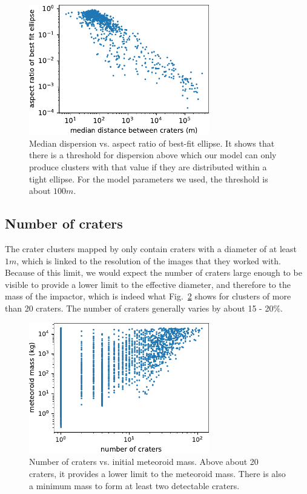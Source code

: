 \begin{figure}
    \centering
    \includegraphics[width=0.7\textwidth]{figures/disp_vs_aspect}
    \caption{Median dispersion vs. aspect ratio of best-fit ellipse. It shows that there is a threshold for dispersion above which our model can only produce clusters with that value if they are distributed within a tight ellipse. For the model parameters we used, the threshold is about $100\unit{m}$.}
    \label{fig:disp_vs_aspect}
\end{figure}

\subsection{Number of craters}
The crater clusters mapped by \cite{daubar2019recently} only contain craters with a diameter of at least $1\unit{m}$, which is linked to the resolution of the images that they worked with.
Because of this limit, we would expect the number of craters large enough to be visible to provide a lower limit to the effective diameter, and therefore to the mass of the impactor, which is indeed what Fig.~\ref{fig:n_craters_vs_m} shows for clusters of more than 20 craters.
The number of craters generally varies by about 15 - 20\%.

\begin{figure}
    \centering
    \includegraphics[width=0.7\textwidth]{figures/n_craters_vs_mass}
    \caption{Number of craters vs. initial meteoroid mass. Above about 20 craters, it provides a lower limit to the meteoroid mass. There is also a minimum mass to form at least two detectable craters.}
    \label{fig:n_craters_vs_m}
\end{figure}

